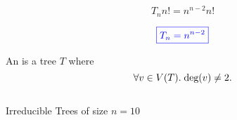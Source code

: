\begin{frame}{}
  \[
    T_n n! = n^{n-2}n!
  \]

  \pause
  \[
    \textcolor{blue}{\boxed{T_{n} = n^{n-2}}}
  \]

  \pause
\end{frame}

\begin{frame}{}
  \begin{definition}
    An  is a tree $T$ where
    \[
      \forall v \in V(T).\; \text{deg}(v) \neq 2.
    \]
  \end{definition}

  \pause
  \vspace{0.30cm}
  \begin{columns}
      \pause
  \end{columns}

  \pause
  \vspace{0.30cm}
  \begin{center}
     Irreducible Trees of size $n = 10$
  \end{center}
\end{frame}
